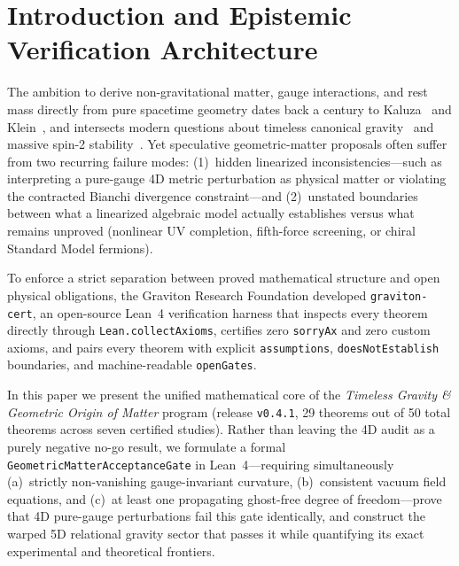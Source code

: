\documentclass[11pt,a4paper]{article}
\theoremstyle{plain}
\theoremstyle{remark}
\newcommand{\code}[1]{\texttt{\small #1}}
\begin{document}
\tableofcontents
\bigskip

\section{Introduction and Epistemic Verification Architecture}

The ambition to derive non-gravitational matter, gauge interactions, and rest mass directly from pure spacetime geometry dates back a century to Kaluza~\cite{Kaluza1921} and Klein~\cite{Klein1926}, and intersects modern questions about timeless canonical gravity~\cite{PageWootters1983} and massive spin-2 stability~\cite{FierzPauli1939,BoulwareDeser1972,Higuchi1987,deRham2011}. Yet speculative geometric-matter proposals often suffer from two recurring failure modes: (1)~hidden linearized inconsistencies—such as interpreting a pure-gauge 4D metric perturbation as physical matter or violating the contracted Bianchi divergence constraint—and (2)~unstated boundaries between what a linearized algebraic model actually establishes versus what remains unproved (nonlinear UV completion, fifth-force screening, or chiral Standard Model fermions).

To enforce a strict separation between proved mathematical structure and open physical obligations, the Graviton Research Foundation developed \code{graviton-cert}, an open-source Lean~4 verification harness that inspects every theorem directly through \code{Lean.collectAxioms}, certifies zero \code{sorryAx} and zero custom axioms, and pairs every theorem with explicit \code{assumptions}, \code{doesNotEstablish} boundaries, and machine-readable \code{openGates}.

In this paper we present the unified mathematical core of the \emph{Timeless Gravity \& Geometric Origin of Matter} program (release \code{v0.4.1}, 29 theorems out of 50 total theorems across seven certified studies). Rather than leaving the 4D audit as a purely negative no-go result, we formulate a formal \code{GeometricMatterAcceptanceGate} in Lean~4—requiring simultaneously (a)~strictly non-vanishing gauge-invariant curvature, (b)~consistent vacuum field equations, and (c)~at least one propagating ghost-free degree of freedom—prove that 4D pure-gauge perturbations fail this gate identically, and construct the warped 5D relational gravity sector that passes it while quantifying its exact experimental and theoretical frontiers.
\end{document}
